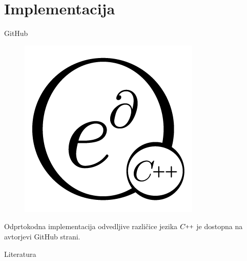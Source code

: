\documentclass{beamer}
\newcommand{\CC}{C\nolinebreak\hspace{-.05em}\raisebox{.4ex}{\tiny\bf +}\nolinebreak\hspace{-.10em}\raisebox{.4ex}{\tiny\bf +}}
\def\CC{{C\nolinebreak[4]\hspace{-.05em}\raisebox{.4ex}{\tiny\bf ++}}}
\begin{document}
\section{Implementacija}
\begin{frame}{GitHub}
\begin{figure}[h]
\centering
\includegraphics[width=0.5\linewidth]{edCpplogo.png}
\end{figure}
Odprtokodna implementacija odvedljive različice jezika $\CC$ je dostopna na avtorjevi GitHub strani. \cite{dC++Man,dC++}
\end{frame}

\begin{frame}{Literatura}


\end{frame}
\end{document}
